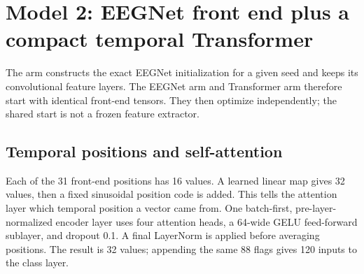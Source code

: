 \documentclass[11pt,a4paper]{article}
\begin{document}
\newpage
\section{Model 2: EEGNet front end plus a compact temporal Transformer}
The arm constructs the exact EEGNet initialization for a given seed and keeps
its convolutional feature layers. The EEGNet arm and Transformer arm therefore
start with identical front-end tensors. They then optimize independently; the
shared start is not a frozen feature extractor.

\begin{center}
\end{center}

\subsection*{Temporal positions and self-attention}
Each of the 31 front-end positions has 16 values. A learned linear map gives
32 values, then a fixed sinusoidal position code is added. This tells the
attention layer which temporal position a vector came from. One batch-first,
pre-layer-normalized encoder layer uses four attention heads, a 64-wide GELU
feed-forward sublayer, and dropout 0.1. A final LayerNorm is applied before
averaging positions. The result is 32 values; appending the same 88 flags
gives 120 inputs to the class layer.
\end{document}
